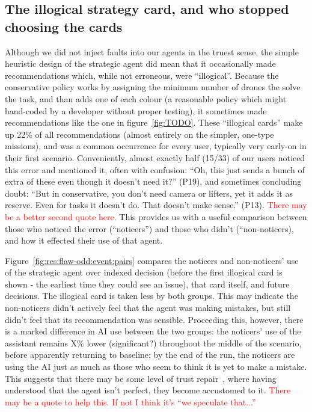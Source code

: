 \clearpage


\subsection{The illogical strategy card, and who stopped choosing the cards}\label{sec:res:flaw-odd}
Although we did not inject faults into our agents in the truest sense, the simple heuristic design of the strategic agent did mean that it occasionally made recommendations which, while not erroneous, were ``illogical''. Because the conservative policy works by assigning the minimum number of drones the solve the task, and than adds one of each colour (a reasonable policy which might hand-coded by a developer without proper testing), it sometimes made recommendations like the one in figure~\ref{fig:TODO}. These ``illogical cards'' make up 22\% of all recommendations (almost entirely on the simpler, one-type missions), and was a common occurrence for every user, typically very early-on in their first scenario. Conveniently, almost exactly half (15/33) of our users noticed this error and mentioned it, often with confusion: ``Oh, this just sends a bunch of extra of these even though it doesn't need it?'' (P19), and sometimes concluding doubt: ``But in conservative, you don't need camera or lifters, yet it adds it as reserve. Even for tasks it doesn't do. That doesn't make sense.'' (P13). \textcolor{red}{There may be a better second quote here.} This provides us with a useful comparison between those who noticed the error (``noticers'') and those who didn't (``non-noticers), and how it effected their use of that agent.


Figure~\ref{fig:res:flaw-odd:event:pairs} compares the noticers and non-noticers' use of the strategic agent over indexed decision (before the first illogical card is shown - the earliest time they could see an issue), that card itself, and future decisions. The illogical card is taken less by both groups. This may indicate the non-noticers didn't actively feel that the agent was making mistakes, but still didn't feel that its recommendation was sensible. Proceeding this, however, there is a marked difference in AI use between the two groups: the noticers' use of the assistant remains X\% lower (significant?) throughout the middle of the scenario, before apparently returning to baseline; by the end of the run, the noticers are using the AI just as much as those who seem to think it is yet to make a mistake. This suggests that there may be some level of trust repair~\cite{TODO}, where having understood that the agent isn't perfect, they become accustomed to it. \textcolor{red}{There may be a quote to help this. If not I think it's ``we speculate that...''}

